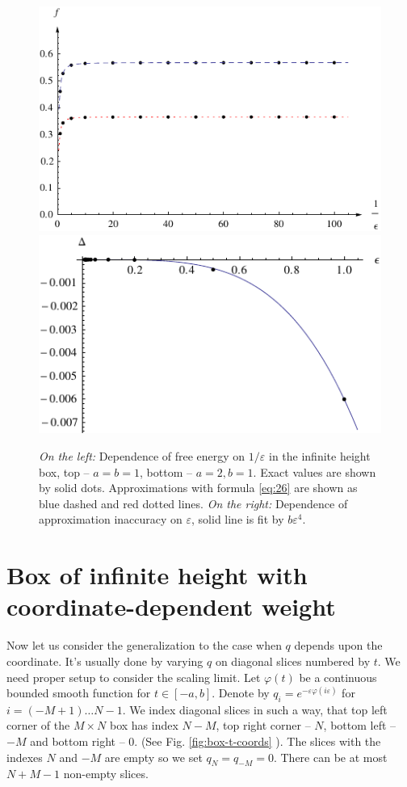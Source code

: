 \documentclass{article}
\begin{document}
\begin{figure}[htbp]
  \includegraphics[scale=0.8]{exact-vs-approximation-2d}
  \includegraphics[scale=0.9]{error-2d}
  \caption{\label{fig:approx-acc-2d} {\it On the left:} Dependence of free energy on $1/\varepsilon$
    in the infinite height box,
    top -- $a=b=1$, bottom -- $a=2, b=1$. Exact values are shown by solid dots.
    Approximations with formula \eqref{eq:26} are shown as blue dashed and red dotted lines. {\it On
      the right:} Dependence of approximation inaccuracy on $\varepsilon$, solid line is fit by $b\varepsilon^{4}$.}
\end{figure}

\section{Box of infinite height with coordinate-dependent weight}
\label{sec:box-infinite-height}


Now let us consider the generalization to the case when $q$ depends upon the coordinate. It's usually
done by varying $q$ on diagonal slices numbered by $t$. We need proper setup to consider the scaling
limit. Let $\varphi(t)$ be a continuous bounded smooth function for $t\in\left[-a,b\right]$. Denote by
$q_{i}=e^{-\varepsilon \varphi\left(i\varepsilon\right)}$ for $i=(-M+1)\dots N-1$. We index diagonal slices in
such a way, that top left corner of the $M\times N$ box has index $N-M$, top right corner -- $N$,
bottom left -- $-M$ and bottom right -- $0$. (See Fig. \ref{fig:box-t-coords} ). The slices with the
indexes $N$ and $-M$ are empty so we set $q_{N}=q_{-M}=0$. There can be at most $N+M-1$ non-empty
slices. 
\end{document}
